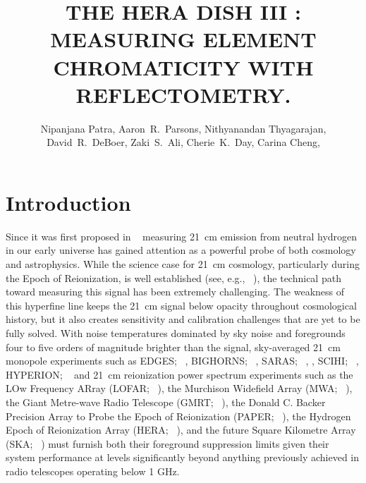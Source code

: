 \documentclass[twocolumn]{emulateapj}
\def\UCB{\altaffilmark{1}}
\def\ASU{\altaffilmark{2}}
\def\myemail{\altaffilmark{$\dagger$}}
\begin{document}
\title{THE HERA DISH III : MEASURING ELEMENT CHROMATICITY WITH REFLECTOMETRY. } 

\author{
Nipanjana Patra\UCB\myemail,
Aaron~R.~Parsons\UCB,
Nithyanandan Thyagarajan\ASU,
David~R.~DeBoer\UCB,
Zaki~S.~Ali\UCB,
Cherie~K.~Day\UCB, 
Carina Cheng\UCB,
}

\begin{abstract}
\end{abstract}


\section{\textbf{Introduction}}

Since it was first proposed in ~\citep{Shaver_et_al1999} measuring 21~cm
emission from neutral hydrogen in our early universe has gained attention as a
powerful probe of both cosmology and astrophysics.  While the science case for
21~cm cosmology, particularly during the Epoch of Reionization, is well
established (see, e.g.,
~\cite{furlanetto_et_al2006, morales_wyithe2010, pritchard_loeb2012}),
the technical path toward measuring this signal has been extremely challenging.  The
weakness of this hyperfine line keeps the 21~cm signal below opacity throughout
cosmological history, but it also creates sensitivity and calibration
challenges that are yet to be fully solved.  With noise temperatures dominated
by sky noise and foregrounds four to five orders of magnitude
brighter than the signal, 
sky-averaged 21~cm monopole experiments such as
EDGES; ~\citep{Bowman_et_al2010},
BIGHORNS; ~\citealt{2015PhDT........65V},
SARAS; ~\citep{Patra_et_al2015}, \citep{Patra_et_al2013} ,
SCIHI; ~\citep{2015PhDT........65V},
HYPERION; ~\citep{presley_et_al2015}
and 21~cm reionization power spectrum experiments such as
the LOw Frequency ARray (LOFAR; ~\citealt{XXX}),
the Murchison Widefield Array (MWA; ~\citealt{XXX}),
the Giant Metre-wave Radio Telescope (GMRT; ~\citealt{XXX}),
the Donald C. Backer Precision Array to Probe the Epoch of Reionization (PAPER; ~\citealt{parsons_et_al2010}),
the Hydrogen Epoch of Reionization Array (HERA; ~\citealt{XXX}),
and the future Square Kilometre Array (SKA; ~\citealt{XXX})
must furnish both their foreground suppression limits given their system performance at levels significantly
beyond anything previously achieved in radio telescopes operating below 1 GHz.
\end{document}
